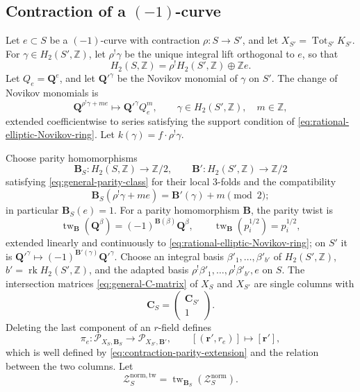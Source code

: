 \documentclass{amsart}
\theoremstyle{definition}
\numberwithin{equation}{section}
\newcommand{\Z}{\mathbb Z}
\newcommand{\Tot}{\operatorname{Tot}}
\newcommand{\rk}{\operatorname{rk}}
\begin{document}
\subsection{Contraction of a \texorpdfstring{\((-1)\)-curve}{(-1)-curve}}
Let \(e\subset S\) be a \((-1)\)-curve with contraction \(\rho:S\to S'\), and let \(X_{S'}=\Tot_{S'}K_{S'}\).  For \(\gamma\in H_2(S',\Z)\), let \(\rho^!\gamma\) be the unique integral lift orthogonal to \(e\), so that
\[
 H_2(S,\Z)=\rho^!H_2(S',\Z)\oplus\Z e.
\]
Let \(Q_e=\mathbf Q^e\), and let \(\mathbf Q'^{\gamma}\) be the Novikov monomial of \(\gamma\) on \(S'\).  The change of Novikov monomials is
\begin{equation}
 \mathbf Q^{\rho^!\gamma+m e}
 \longmapsto \mathbf Q'^{\gamma}Q_e^m,
 \qquad \gamma\in H_2(S',\Z),\quad m\in\Z,
 \label{eq:contraction-curve-variable-map}
\end{equation}
extended coefficientwise to series satisfying the support condition of \eqref{eq:rational-elliptic-Novikov-ring}.  Let \(k(\gamma)=f\cdot\rho^!\gamma\).

Choose parity homomorphisms
\[
 \mathbf B_S:H_2(S,\Z)\longrightarrow\Z/2,
 \qquad
 \mathbf B':H_2(S',\Z)\longrightarrow\Z/2
\]
satisfying \eqref{eq:general-parity-class} for their local 3-folds and the compatibility
\begin{equation}
 \mathbf B_S(\rho^!\gamma+m e)
 =\mathbf B'(\gamma)+m\pmod2;
 \label{eq:contraction-parity-extension}
\end{equation}
in particular \(\mathbf B_S(e)=1\).  For a parity homomorphism \(\mathbf B\), the parity twist is
\begin{equation}
 \operatorname{tw}_{\mathbf B}(\mathbf Q^\beta)
 =(-1)^{\mathbf B(\beta)}\mathbf Q^\beta,
 \qquad \operatorname{tw}_{\mathbf B}(p_i^{1/2})=p_i^{1/2},
 \label{eq:parity-twist-homomorphism}
\end{equation}
extended linearly and continuously to \eqref{eq:rational-elliptic-Novikov-ring}; on \(S'\) it is \(\mathbf Q'^\gamma\mapsto(-1)^{\mathbf B'(\gamma)} \mathbf Q'^\gamma\).  Choose an integral basis \(\beta'_1,\ldots,\beta'_{b'}\) of \(H_2(S',\Z)\), \(b'=\rk H_2(S',\Z)\), and the adapted basis \(\rho^!\beta'_1,\ldots,\rho^!\beta'_{b'},e\) on \(S\).  The intersection matrices \eqref{eq:general-C-matrix} of \(X_S\) and \(X_{S'}\) are single columns with
\[
 \mathbf C_S=\begin{pmatrix}\mathbf C_{S'}\\1\end{pmatrix}.
\]
Deleting the last component of an \(r\)-field defines
\begin{equation}
 \pi_e:
 \mathcal P_{X_S,\mathbf B_S}\longrightarrow
 \mathcal P_{X_{S'},\mathbf B'},
 \qquad
 [(\mathbf r',r_e)]\longmapsto[\mathbf r'],
\label{eq:contraction-r-field-projection}
\end{equation}
which is well defined by \eqref{eq:contraction-parity-extension} and the relation between the two columns.  Let
\[
 \mathcal Z_S^{\mathrm{norm,tw}}
 =\operatorname{tw}_{\mathbf B_S}(\mathcal Z_S^{\mathrm{norm}}).
\]
\end{document}
